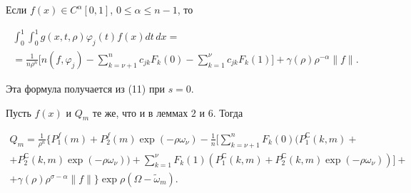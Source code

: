 




\begin{cornonum}


Если $f(x)\in C^\alpha[0,1]$, $0\le\alpha\le n-1$, то


\begin{multline}


\int_0^1\int_0^1g(x,t,\rho)\varphi_j(t)f(x)dt\,dx= \\ =


\frac 1{n\rho^n}\bigg[n(f,\varphi_j)-


\sum\limits_{k=\nu+1}^nc_{jk}


F_k(0)-\sum\limits_{k=1}^{\nu}c_{jk}F_k(1)\bigg]+\gamma(\rho)\rho^


{-\alpha}\|f\|.


\end{multline}





Эта формула получается из (11) при $s=0$.


\end{cornonum}





\begin{lem}


Пусть $f(x)$ и $Q_m$ те же, что и в леммах $2$ и $6$. Тогда


\begin{multline}


Q_m= \frac 1{\rho^n}\bigg\{P_1^f(m)+P_2^f(m)\exp


(-\rho\omega_\nu)- \frac 1n\bigg[\sum\limits_{k=\nu+1}^nF_k(0)


(P_1^С(k,m)+ \\


%


+P_2^С(k,m)\exp(-\rho\omega_\nu))+\sum\limits_{k=1}^{\nu}F_k(1)


(P_1^С(k,m)+P_2^С(k,m)\exp(-\rho\omega_\nu))\bigg]+ \\


%


+\gamma(\rho)\rho^{\sigma-\alpha}\|f\|\bigg\}\exp\rho(\Omega-


\widetilde\omega_m).


\end{multline}


\end{lem}





